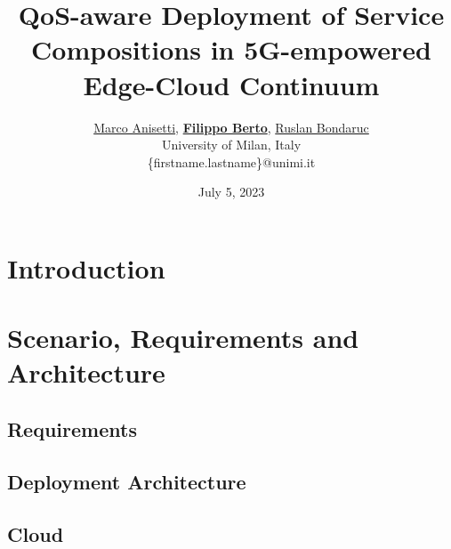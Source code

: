 
\usepackage{cite}
\usepackage{soul}

\usepackage{qrcode}
\usepackage{fontawesome,academicons}
\usepackage{verbatim}

\usepackage{adjustbox}
\usepackage[acronym]{glossaries}



\usepackage{shellesc}
\usepackage{tikz}
\usetikzlibrary{external}
\tikzexternalize %


\title{QoS-aware Deployment of Service Compositions in 5G-empowered Edge-Cloud Continuum}
\author{
	\href{mailto:marco.anisetti@unimi.it}{Marco Anisetti},
	\href{mailto:filippo.berto@unimi.it}{\textbf{Filippo Berto}},
	\href{mailto:ruslan.bondaruc@unimi.it}{Ruslan Bondaruc}\\
	University of Milan, Italy\\
	\{firstname.lastname\}@unimi.it
}
\date{July 5, 2023}



\maketitle

\section{Introduction}

\section{Scenario, Requirements and Architecture}

\subsection{Requirements}

\subsection{Deployment Architecture}

\subsection{Cloud}

